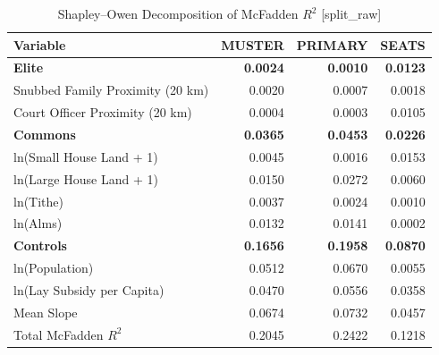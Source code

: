 \begin{table}[H]
\centering
\caption{Shapley--Owen Decomposition of McFadden $R^2$ [split_raw]}
\label{tab:shapley_owen_split_raw}
\begin{tabular}{lrrr}
\hline\hline
Variable & MUSTER & PRIMARY & SEATS \\
\hline
\textbf{Elite} & \textbf{0.0024} & \textbf{0.0010} & \textbf{0.0123} \\
\quad Snubbed Family Proximity (20 km) & 0.0020 & 0.0007 & 0.0018 \\
\quad Court Officer Proximity (20 km) & 0.0004 & 0.0003 & 0.0105 \\
\textbf{Commons} & \textbf{0.0365} & \textbf{0.0453} & \textbf{0.0226} \\
\quad ln(Small House Land + 1) & 0.0045 & 0.0016 & 0.0153 \\
\quad ln(Large House Land + 1) & 0.0150 & 0.0272 & 0.0060 \\
\quad ln(Tithe) & 0.0037 & 0.0024 & 0.0010 \\
\quad ln(Alms) & 0.0132 & 0.0141 & 0.0002 \\
\textbf{Controls} & \textbf{0.1656} & \textbf{0.1958} & \textbf{0.0870} \\
\quad ln(Population) & 0.0512 & 0.0670 & 0.0055 \\
\quad ln(Lay Subsidy per Capita) & 0.0470 & 0.0556 & 0.0358 \\
\quad Mean Slope & 0.0674 & 0.0732 & 0.0457 \\
\hline
Total McFadden $R^2$ & 0.2045 & 0.2422 & 0.1218 \\
\hline\hline
\end{tabular}
\end{table}
